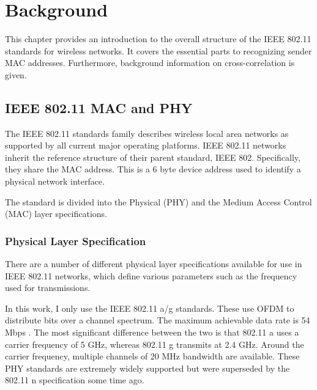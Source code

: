 
\chapter{Background}\label{ch:relatedwork}
\glsresetall %

This chapter provides an introduction to the overall structure of the \gls{IEEE} 802.11 standards for wireless networks. It covers the essential parts to recognizing sender \gls{MAC} addresses. Furthermore, background information on cross-correlation is given.



\section{IEEE 802.11 MAC and PHY} \label{sec:mac-and-phy}

The \gls{IEEE} 802.11 standards family describes wireless local area networks as supported by all current major operating platforms. \gls{IEEE} 802.11 networks inherit the reference structure of their parent standard, \gls{IEEE} 802. Specifically, they share the \gls{MAC} address. This is a 6 byte device address used to identify a physical network interface.

The standard is divided into the Physical (PHY) and the Medium Access Control (MAC) layer specifications.


\subsection{Physical Layer Specification}

There are a number of different physical layer specifications available for use in \gls{IEEE} 802.11 networks, which define various parameters such as the frequency used for transmissions.

In this work, I only use the \gls{IEEE} 802.11 a/g standards. These use \gls{OFDM} to distribute bits over a channel spectrum. The maximum achievable data rate is 54 \gls{Mbps} \cite{ieee2012}. The most significant difference between the two is that 802.11 a uses a carrier frequency of 5 GHz, whereas 802.11 g transmits at 2.4 GHz. Around the carrier frequency, multiple channels of 20 MHz bandwidth are available. These \gls{PHY} standards are extremely widely supported but were superseded by the 802.11 n specification some time ago.

